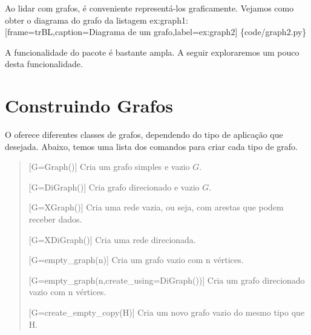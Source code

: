 \documentclass[a4paper,10pt,brazil]{sphinxmanual}
\begin{document}
Ao lidar com grafos, é conveniente representá-los graficamente.
Vejamos como obter o diagrama do grafo da listagem ex:graph1:
{[}frame=trBL,caption=Diagrama de um grafo,label=ex:graph2{]} \{code/graph2.py\}

A funcionalidade do pacote  é bastante ampla. A seguir
exploraremos um pouco desta funcionalidade.


\section{Construindo Grafos}
\label{capgraph:construindo-grafos}
O  oferece diferentes classes de grafos, dependendo do
tipo de aplicação que desejada. Abaixo, temos uma lista dos
comandos para criar cada tipo de grafo.
\begin{quote}

{[}G=Graph(){]} Cria um grafo simples e vazio $G$.

{[}G=DiGraph(){]} Cria grafo direcionado e vazio $G$.

{[}G=XGraph(){]} Cria uma rede vazia, ou seja, com arestas que podem
receber dados.

{[}G=XDiGraph(){]} Cria uma rede direcionada.

{[}G=empty\_graph(n){]} Cria um grafo vazio com n vértices.

{[}G=empty\_graph(n,create\_using=DiGraph()){]} Cria um grafo
direcionado vazio com n vértices.

{[}G=create\_empty\_copy(H){]} Cria um novo grafo vazio do mesmo tipo
que H.
\end{quote}
\end{document}
